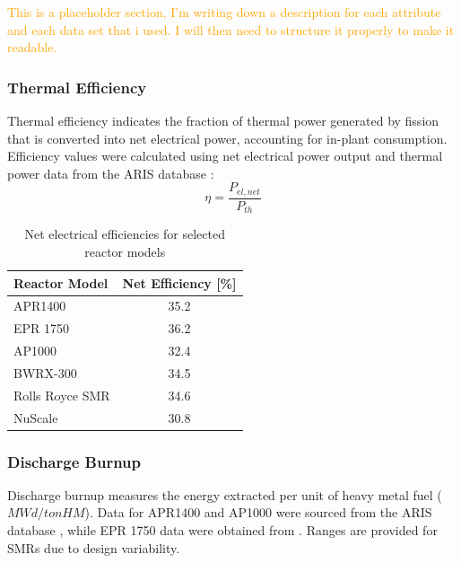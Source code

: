\textcolor{orange}{This is a placeholder section, I'm writing down a description for each attribute and each data set that i used. I will then need to structure it properly to make it readable.}

\subsubsection{Thermal Efficiency}
Thermal efficiency indicates the fraction of thermal power generated by fission that is converted into net electrical power, accounting for in-plant consumption. Efficiency values were calculated using net electrical power output and thermal power data from the ARIS database \cite{iaea2025aris}:
$$
\eta = \frac{P_{el,net}}{P_{th}}
$$

\begin{table}[!ht]
    \centering
    \begin{tabularx}{\textwidth}{X c}
        \toprule
        \textbf{Reactor Model} & \textbf{Net Efficiency [\%]} \\
        \midrule
        APR1400         & 35.2 \\
        EPR 1750        & 36.2 \\
        AP1000          & 32.4 \\
        BWRX-300        & 34.5 \\
        Rolls Royce SMR & 34.6 \\
        NuScale         & 30.8 \\
        \bottomrule
    \end{tabularx}
    \caption{Net electrical efficiencies for selected reactor models}
    \label{tab:reactor-efficiency}
\end{table}



\subsubsection{Discharge Burnup}
Discharge burnup measures the energy extracted per unit of heavy metal fuel ($MWd/tonHM$). Data for APR1400 and AP1000 were sourced from the ARIS database \cite{iaea2025aris}, while EPR 1750 data were obtained from \cite{NRC_ML052280170}. Ranges are provided for SMRs due to design variability.

